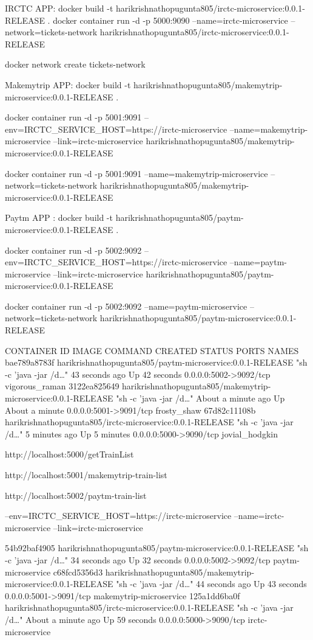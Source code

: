 IRCTC APP:
docker build -t harikrishnathopugunta805/irctc-microservice:0.0.1-RELEASE .
docker container run -d -p 5000:9090 --name=irctc-microservice --network=tickets-network  harikrishnathopugunta805/irctc-microservice:0.0.1-RELEASE

docker network create tickets-network


Makemytrip APP:
docker build -t harikrishnathopugunta805/makemytrip-microservice:0.0.1-RELEASE .

docker container run -d -p 5001:9091 --env=IRCTC_SERVICE_HOST=https://irctc-microservice --name=makemytrip-microservice --link=irctc-microservice harikrishnathopugunta805/makemytrip-microservice:0.0.1-RELEASE


docker container run -d -p 5001:9091 --name=makemytrip-microservice --network=tickets-network harikrishnathopugunta805/makemytrip-microservice:0.0.1-RELEASE


Paytm APP :
docker build -t harikrishnathopugunta805/paytm-microservice:0.0.1-RELEASE .

docker container run -d -p 5002:9092 --env=IRCTC_SERVICE_HOST=https://irctc-microservice --name=paytm-microservice --link=irctc-microservice harikrishnathopugunta805/paytm-microservice:0.0.1-RELEASE

docker container run -d -p 5002:9092 --name=paytm-microservice --network=tickets-network harikrishnathopugunta805/paytm-microservice:0.0.1-RELEASE

CONTAINER ID   IMAGE                                                            COMMAND                  CREATED              STATUS              PORTS                    NAMES
bae789a8783f   harikrishnathopugunta805/paytm-microservice:0.0.1-RELEASE        "sh -c 'java -jar /d…"   43 seconds ago       Up 42 seconds       0.0.0.0:5002->9092/tcp   vigorous_raman
3122ea825649   harikrishnathopugunta805/makemytrip-microservice:0.0.1-RELEASE   "sh -c 'java -jar /d…"   About a minute ago   Up About a minute   0.0.0.0:5001->9091/tcp   frosty_shaw
67d82c11108b   harikrishnathopugunta805/irctc-microservice:0.0.1-RELEASE        "sh -c 'java -jar /d…"   5 minutes ago        Up 5 minutes        0.0.0.0:5000->9090/tcp   jovial_hodgkin



http://localhost:5000/getTrainList

http://localhost:5001/makemytrip-train-list


http://localhost:5002/paytm-train-list


--env=IRCTC_SERVICE_HOST=https://irctc-microservice
--name=irctc-microservice 
--link=irctc-microservice 

54b92baf4905   harikrishnathopugunta805/paytm-microservice:0.0.1-RELEASE        "sh -c 'java -jar /d…"   34 seconds ago       Up 32 seconds   0.0.0.0:5002->9092/tcp   paytm-microservice
c68fcd5356d3   harikrishnathopugunta805/makemytrip-microservice:0.0.1-RELEASE   "sh -c 'java -jar /d…"   44 seconds ago       Up 43 seconds   0.0.0.0:5001->9091/tcp   makemytrip-microservice
125a1dd6ba0f   harikrishnathopugunta805/irctc-microservice:0.0.1-RELEASE        "sh -c 'java -jar /d…"   About a minute ago   Up 59 seconds   0.0.0.0:5000->9090/tcp   irctc-microservice